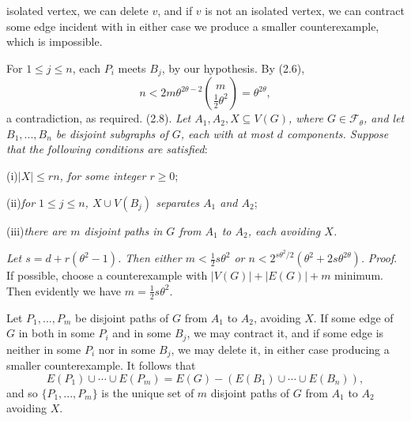 \noindent isolated vertex, we can delete $v$, and if $v$ is not an isolated vertex, we can
contract some edge incident with  in either case we produce a smaller
counterexample, which is impossible.

For $1\le j\le n$, each $P_i$ meets $B_j$, by our hypothesis. By (2.6),
\begin{equation*}
n<2m\theta^{2\theta-2}\binom{m}{\frac12\theta^2}=\theta^{2\theta},
\end{equation*}
a contradiction, as required.
\stmt
(2.8). \textit{Let $A_1, A_2, X\subseteq V(G)$, where $G\in\mathscr{F}_\theta$, and let $B_1,..., B_n$ be disjoint
subgraphs of $G$, each with at most $d$ components. Suppose that the following
conditions are satisfied}:

\hspace*{12pt}(i)\enspace\textit{$|X|\le rn$, for some integer $r\ge 0$};

\hspace*{12pt}(ii)\enspace\textit{for $1\le j\le n$, $X\cup V(B_j)$ separates $A_1$ and $A_2$};

\hspace*{12pt}(iii)\enspace\textit{there are $m$ disjoint paths in $G$ from $A_1$ to $A_2$, each avoiding $X$.}

\noindent\textit{ Let $s=d+r(\theta^2-1)$. Then either $m<\frac12 s\theta^2$ or $n<2^{s\theta^2/2}(\theta^2+2s\theta^{2\theta})$.}
\stmt
\textit{Proof}. If possible, choose a counterexample with $|V(G)|+|E(G)|+m$
minimum. Then evidently we have $m=\frac12 s\theta^2$.

Let $P_1,..., P_m$ be disjoint paths of $G$ from $A_1$ to $A_2$, avoiding $X$. If some
edge of $G$ in both in some $P_i$ and in some $B_j$, we may contract it, and if
some edge is neither in some $P_i$ nor in some $B_j$, we may delete it, in either
case producing a smaller counterexample. It follows that
\begin{equation*}
E(P_1)\cup\cdots\cup E(P_m)=E(G)-(E(B_1)\cup\cdots\cup E(B_n)),
\end{equation*}
and so $\{P_1,..., P_m\}$ is the unique set of $m$ disjoint paths of $G$ from $A_1$ to $A_2$
avoiding $X$.

